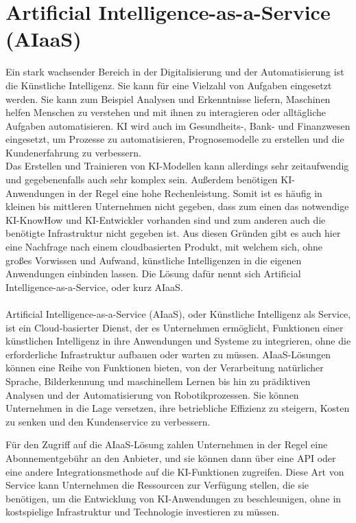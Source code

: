 \newpage
\section{Artificial Intelligence-as-a-Service (AIaaS)}
Ein stark wachsender Bereich in der Digitalisierung und der Automatisierung ist die Künstliche Intelligenz. Sie kann für eine Vielzahl von Aufgaben eingesetzt werden. Sie kann zum Beispiel Analysen und Erkenntnisse liefern, Maschinen helfen Menschen zu verstehen und mit ihnen zu interagieren oder alltägliche Aufgaben automatisieren. KI wird auch im Gesundheits-, Bank- und Finanzwesen eingesetzt, um Prozesse zu automatisieren, Prognosemodelle zu erstellen und die Kundenerfahrung zu verbessern. \\
Das Erstellen und Trainieren von KI-Modellen kann allerdings sehr zeitaufwendig und gegebenenfalls auch sehr komplex sein. Außerdem benötigen KI-Anwendungen in der Regel eine hohe Rechenleistung. Somit ist es häufig in kleinen bis mittleren Unternehmen nicht gegeben, dass zum einen das notwendige KI-KnowHow und KI-Entwickler vorhanden sind und zum anderen auch die benötigte Infrastruktur nicht gegeben ist. Aus diesen Gründen gibt es auch hier eine Nachfrage nach einem cloudbasierten Produkt, mit welchem sich, ohne großes Vorwissen und Aufwand, künstliche Intelligenzen in die eigenen Anwendungen einbinden lassen. Die Lösung dafür nennt sich Artificial Intelligence-as-a-Service, oder kurz AIaaS. \cite[vgl.][441f.]{Lins.2021} \\ \\
Artificial Intelligence-as-a-Service (AIaaS), oder Künstliche Intelligenz als Service, ist ein Cloud-basierter Dienst, der es Unternehmen ermöglicht, Funktionen einer künstlichen Intelligenz in ihre Anwendungen und Systeme zu integrieren, ohne die erforderliche Infrastruktur aufbauen oder warten zu müssen. AIaaS-Lösungen können eine Reihe von Funktionen bieten, von der Verarbeitung natürlicher Sprache, Bilderkennung und maschinellem Lernen bis hin zu prädiktiven Analysen und der Automatisierung von Robotikprozessen. Sie können Unternehmen in die Lage versetzen, ihre betriebliche Effizienz zu steigern, Kosten zu senken und den Kundenservice zu verbessern.

Für den Zugriff auf die AIaaS-Lösung zahlen Unternehmen in der Regel eine Abonnementgebühr an den Anbieter, und sie können dann über eine API oder eine andere Integrationsmethode auf die KI-Funktionen zugreifen. Diese Art von Service kann Unternehmen die Ressourcen zur Verfügung stellen, die sie benötigen, um die Entwicklung von KI-Anwendungen zu beschleunigen, ohne in kostspielige Infrastruktur und Technologie investieren zu müssen. \cite[vgl.]{Cuofano.2022}